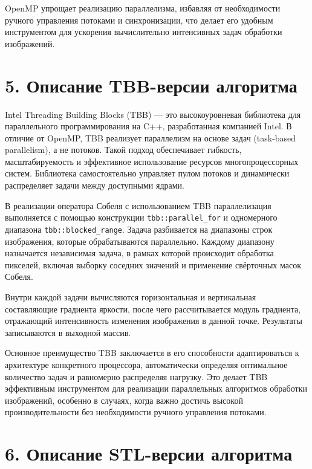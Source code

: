 \documentclass{report}
\begin{document}
OpenMP упрощает реализацию параллелизма, избавляя от необходимости ручного управления потоками и синхронизации, что делает его удобным инструментом для ускорения вычислительно интенсивных задач обработки изображений.


\newpage  
\section*{5. Описание TBB-версии алгоритма}  
\justifying  

Intel Threading Building Blocks (TBB) — это высокоуровневая библиотека для параллельного программирования на C++, разработанная компанией Intel. В отличие от OpenMP, TBB реализует параллелизм на основе задач (task-based parallelism), а не потоков. Такой подход обеспечивает гибкость, масштабируемость и эффективное использование ресурсов многопроцессорных систем. Библиотека самостоятельно управляет пулом потоков и динамически распределяет задачи между доступными ядрами.

В реализации оператора Собеля с использованием TBB параллелизация выполняется с помощью конструкции \texttt{tbb::parallel\_for} и одномерного диапазона \texttt{tbb::blocked\_range}. Задача разбивается на диапазоны строк изображения, которые обрабатываются параллельно. Каждому диапазону назначается независимая задача, в рамках которой происходит обработка пикселей, включая выборку соседних значений и применение свёрточных масок Собеля.

Внутри каждой задачи вычисляются горизонтальная и вертикальная составляющие градиента яркости, после чего рассчитывается модуль градиента, отражающий интенсивность изменения изображения в данной точке. Результаты записываются в выходной массив.

Основное преимущество TBB заключается в его способности адаптироваться к архитектуре конкретного процессора, автоматически определяя оптимальное количество задач и равномерно распределяя нагрузку. Это делает TBB эффективным инструментом для реализации параллельных алгоритмов обработки изображений, особенно в случаях, когда важно достичь высокой производительности без необходимости ручного управления потоками.


\newpage
\section*{6. Описание STL-версии алгоритма}
\justifying
\end{document}
